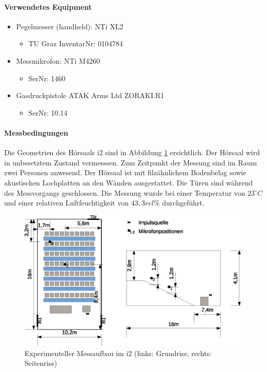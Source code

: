 \documentclass[11pt]{report}
\begin{document}
\paragraph{Verwendetes Equipment}
\begin{itemize}
\item Pegelmesser (handheld): NTi XL2
\begin{itemize}
\item TU Graz InventarNr: 0104784
\end{itemize}
\item Messmikrofon: NTi M4260
\begin{itemize}
\item SerNr: 1460
\end{itemize}
\item Gasdruckpistole ATAK Arms Ltd ZORAKI.R1
\begin{itemize}
\item SerNr: 10.14
\end{itemize}
\end{itemize}
\paragraph{Messbedingungen}
Die Geometrien des H\"orsaals i2 sind in Abbildung \ref{fig:i2geometrics} ersichtlich. Der H\"orsaal wird in unbesetztem Zustand vermesssen. Zum Zeitpunkt der Messung sind im Raum zwei Personen anwesend. Der H\"orsaal ist mit filz\"ahnlichem Bodenbelag sowie akustischen Lochplatten an den W\"anden ausgestattet. Die T\"uren sind w\"ahrend des Messvorgangs geschlossen. Die Messung wurde bei einer Temperatur von $23^\circ C$ und einer relativen Luftfeuchtigkeit von $43,3rel\%$ durchgef\"uhrt. 
\begin{figure}[htbp]
\begin{center}
\includegraphics[width=14cm,keepaspectratio=true]{i2}
\caption{Experimenteller Messaufbau im i2 (links: Grundriss; rechts: Seitenriss)}
\label{fig:i2geometrics}
\end{center}
\end{figure}
\end{document}
